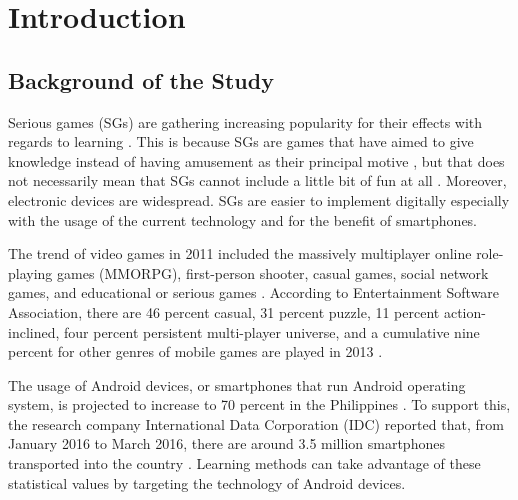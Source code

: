 \documentclass[journal]{./IEEE/IEEEtran}
\title{\SPTITLE}
\author{\ADVISEE~and~\ADVISER%
\REMARK
}
\begin{document}
\maketitle



\section{Introduction}

\subsection{Background of the Study}
Serious games (SGs) are gathering increasing popularity for their effects with regards to learning \cite{degloria2014serious}. This is because SGs are games that have aimed to give knowledge instead of having amusement as their principal motive \cite{djaouti2011origins}, but that does not necessarily mean that SGs cannot include a little bit of fun at all \cite{burak2005peacemaker}. Moreover, electronic devices are widespread. SGs are easier to implement digitally especially with the usage of the current technology and for the benefit of smartphones.

The trend of video games in 2011 included the massively multiplayer online role-playing games (MMORPG), first-person shooter, casual games, social network games, and educational or serious games \cite{adolph2011trends}. According to Entertainment Software Association, there are 46 percent casual, 31 percent puzzle, 11 percent action-inclined, four percent persistent multi-player universe, and a cumulative nine percent for other genres of mobile games are played in 2013 \cite{entertainment2014essential}.

The usage of Android devices, or smartphones that run Android operating system, is projected to increase to 70 percent in the Philippines \cite{camus2015smartphone}. To support this, the research company International Data Corporation (IDC) reported that, from January 2016 to March 2016, there are around 3.5 million smartphones transported into the country \cite{medenilla2016fastest}. Learning methods can take advantage of these statistical values by targeting the technology of Android devices.
\end{document}
